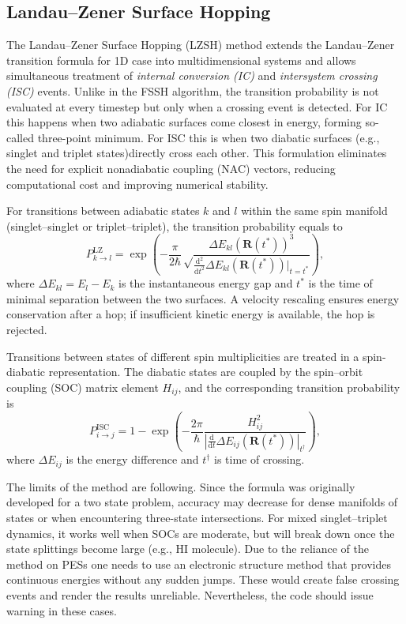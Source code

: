 \subsection{Landau--Zener Surface Hopping}
The Landau--Zener Surface Hopping (LZSH) method extends the Landau--Zener transition formula for 1D case into multidimensional systems and allows simultaneous treatment of \textit{internal conversion (IC)} and \textit{intersystem crossing (ISC)} events.\cite{SuchanLZ} Unlike in the FSSH algorithm, the transition probability is not evaluated at every timestep but only when a crossing event is detected. For IC this happens when two adiabatic surfaces come closest in energy, forming so-called three-point minimum. For ISC this is when two diabatic surfaces (e.g., singlet and triplet states)directly cross each other. This formulation eliminates the need for explicit nonadiabatic coupling (NAC) vectors, reducing computational cost and improving numerical stability. 

For transitions between adiabatic states $k$ and $l$ within the same spin manifold (singlet--singlet or triplet--triplet), the transition probability equals to
\begin{equation}
P_{k \to l}^{\mathrm{LZ}} =
\exp\!\left(-\frac{\pi}{2\hbar}\sqrt
\frac{\Delta E_{kl}(\textbf{R}(t^*))^3}{
\frac{\mathrm{d}^2}{\mathrm{d}t^2}\Delta E_{kl}(\textbf{R}(t^*))|_{t=t^*}}\right),
\end{equation}
where $\Delta E_{kl} = E_l - E_k$ is the instantaneous energy gap and $t^*$ is the time of minimal separation between the two surfaces. A velocity rescaling ensures energy conservation after a hop; if insufficient kinetic energy is available, the hop is rejected.

Transitions between states of different spin multiplicities are treated in a spin-diabatic representation. The diabatic states are coupled by the spin--orbit coupling (SOC) matrix element $H_{ij}$, and the corresponding transition probability is
\begin{equation}
P_{i \to j}^{\mathrm{ISC}} =
1 - \exp\left(-\frac{2\pi}{\hbar}
\frac{H_{ij}^2}{
\left|\frac{\mathrm{d}}{\mathrm{d}t}\Delta E_{ij}(\textbf{R}(t^*))\right|_{t^\dagger}}\right),
\end{equation}
where $\Delta E_{ij}$ is the energy difference and $t^\dagger$ is time of crossing.


The limits of the method are following. Since the formula was originally developed for a two state problem, accuracy may decrease for dense manifolds of states or when encountering three-state intersections. For mixed singlet--triplet dynamics, it works well when SOCs are moderate, but will break down once the state splittings become large (e.g., HI molecule). Due to the reliance of the method on PESs one needs to use an electronic structure method that provides continuous energies without any sudden jumps. These would create false crossing events and render the results unreliable. Nevertheless, the code should issue warning in these cases.\cite{Jira2025}
